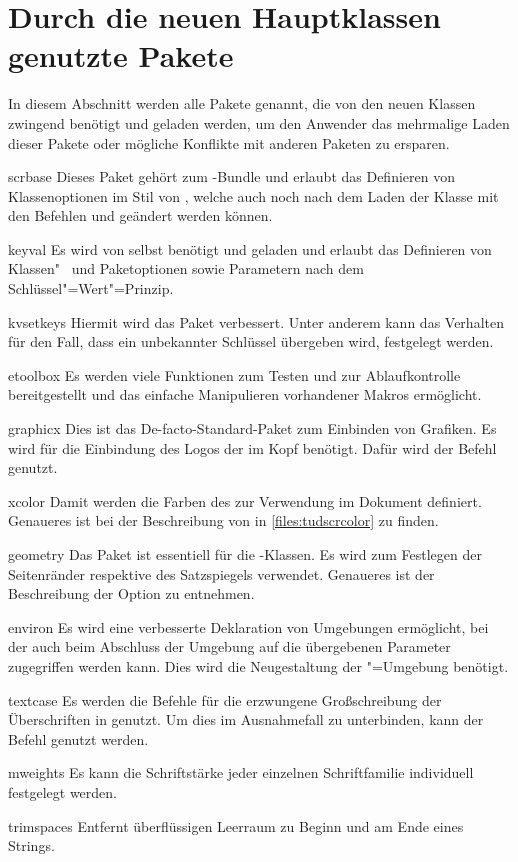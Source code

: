 \documentclass[%
  english,ngerman,%
  headings=optiontoheadandtoc,captions=tableheading,numbers=noenddot,%
  chapterpage,cdfoot,%
]{tudscrman}
\begin{document}
\section{Durch die neuen Hauptklassen genutzte Pakete}
\label{sec:packages:needed}
In diesem Abschnitt werden alle Pakete genannt, die von den neuen Klassen 
zwingend benötigt und geladen werden, um den Anwender das mehrmalige Laden 
dieser Pakete oder mögliche Konflikte mit anderen Paketen zu ersparen.
%
\begin{packages}
\item[scrbase]
  Dieses Paket gehört zum \KOMAScript-Bundle und erlaubt das Definieren von 
  Klassenoptionen im Stil von \KOMAScript, welche auch noch nach dem Laden der 
  Klasse mit den Befehlen  und  geändert 
  werden können.
\item[keyval]
  Es wird von \KOMAScript{} selbst benötigt und geladen und erlaubt das  
  Definieren von Klassen"~ und Paketoptionen sowie Parametern nach dem   
  Schlüssel"=Wert"=Prinzip.
\item[kvsetkeys]
  Hiermit wird das Paket  verbessert. Unter anderem kann das 
  Verhalten für den Fall, dass ein unbekannter Schlüssel übergeben wird,  
  festgelegt werden.
\item[etoolbox]
  Es werden viele Funktionen zum Testen und zur Ablaufkontrolle bereitgestellt 
  und das einfache Manipulieren vorhandener Makros ermöglicht.
\item[graphicx]
  Dies ist das De-facto-Standard-Paket zum Einbinden von Grafiken. Es wird für 
  die Einbindung des Logos der \TnUD im Kopf benötigt. Dafür wird der Befehl
   genutzt.
\item[xcolor]
  Damit werden die Farben des \CDs zur Verwendung im Dokument definiert.  
  Genaueres ist bei der Beschreibung von  in   
  \autoref{files:tudscrcolor} zu finden.
\item[geometry]
  Das Paket ist essentiell für die \TUDScript-Klassen. Es wird zum Festlegen 
  der Seitenränder respektive des Satzspiegels verwendet. Genaueres ist der 
  Beschreibung der Option  zu entnehmen.
\item[environ]
  Es wird eine verbesserte Deklaration von Umgebungen ermöglicht, bei der auch 
  beim Abschluss der Umgebung auf die übergebenen Parameter zugegriffen werden 
  kann. Dies wird die Neugestaltung der "=Umgebung   
  benötigt.
\item[textcase]
  Es werden die Befehle  für die erzwungene   
  Großschreibung der Überschriften in \DIN genutzt. Um dies im Ausnahmefall
  zu unterbinden, kann der Befehl  genutzt werden.
\item[mweights]
  Es kann die Schriftstärke jeder einzelnen Schriftfamilie individuell 
  festgelegt werden.
\item[trimspaces]
  Entfernt überflüssigen Leerraum zu Beginn und am Ende eines Strings.    
\end{packages}
\end{document}
